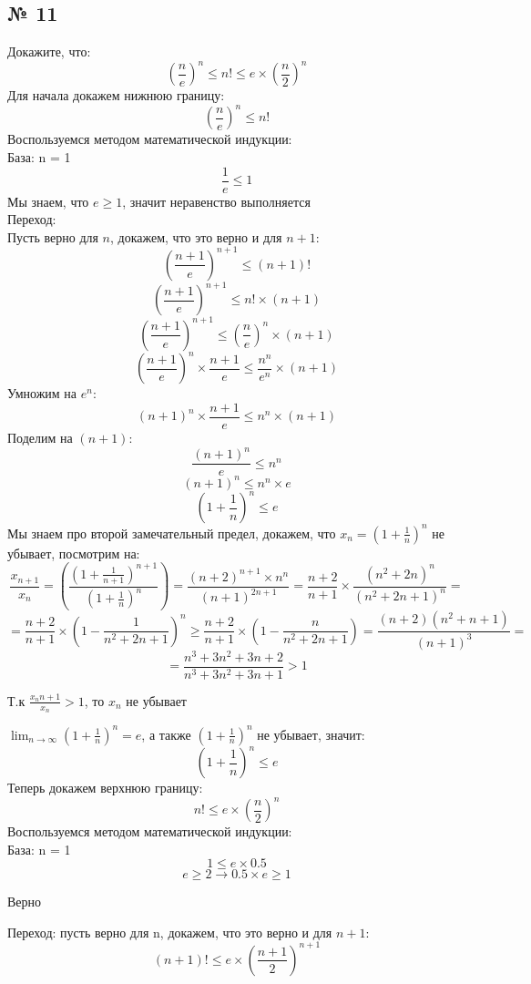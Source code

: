 \documentclass[a4paper,12pt]{article}
\begin{document}
\begin{itemize}
\section*{№ 11}
Докажите,  что:
\[
\left(\frac{n}{e}\right)^n \leq n! \leq e\times \left(\frac{n}{2}\right)^n
\]
Для начала докажем нижнюю границу:
\[
\left(\frac{n}{e}\right)^n \leq n!
\]
Воспользуемся методом математической индукции:
\\
База: n = 1
\\
\[
\frac{1}{e} \leq 1
\]
Мы знаем, что $e \geq 1$, значит неравенство выполняется
\\
Переход:
\\
Пусть верно для $ n $, докажем,  что это верно и для $n+1$:
\[
\left(\frac{n+1}{e}\right)^{n+1} \leq (n+1)!
\]
\[
\left(\frac{n+1}{e}\right)^{n+1} \leq n! \times (n+1)
\]
\[
\left(\frac{n+1}{e}\right)^{n+1} \leq \left(\frac{n}{e}\right)^n \times (n+1)
\]
\[
\left(\frac{n+1}{e}\right)^{n} \times \frac{n+1}{e} \leq \frac{n^n}{e^n} \times (n+1)
\]
Умножим на $e^n$:
\[
(n+1)^n \times \frac{n+1}{e} \leq n^n \times (n+1)
\]
Поделим на $(n+1)$:
\[
\frac{(n+1)^n}{e} \leq n^n
\]
\[
(n+1) ^ n \leq n^n \times e
\]
\[
\left(1 + \frac{1}{n}\right)^n \leq e
\]
Мы знаем про второй замечательный предел, докажем, что $x_n =  \left(1 + \frac{1}{n}\right)^n $ не убывает, посмотрим на:
\[
\frac{x_{n+1}}{x_n} = \left(\frac{(1+\frac{1}{n+1})^{n+1}}{(1+\frac{1}{n})^n}\right) = \frac{(n+2)^{n+1}\times n^n}{(n+1)^{2n+1}} = \frac{n+2}{n+1} \times \frac{(n^2+2n)^n}{(n^2+2n+1)^n} = 
\]
\[
= \frac{n+2}{n+1} \times \left(1 - \frac{1}{n^2+2n+1}\right)^n \geq \frac{n+2}{n+1} \times \left(1 - \frac{n}{n^2+2n+1}\right) = \frac{(n+2)(n^2+n+1)}{(n+1)^3} = 
\]
\[
= \frac{n^3 + 3n^2 +3n + 2}{n^3 + 3n^2 +3n + 1} > 1 
\]
\begin{center}
Т.к $\frac{x_n{n+1}}{x_n} > 1$, то $x_n$ не убывает
\end{center}
$ \lim_{n \rightarrow \infty} \left(1 + \frac{1}{n}\right)^n = e $, а также $ \left(1 + \frac{1}{n}\right)^n $ не убывает, значит:
\[
\left(1 + \frac{1}{n}\right)^n \leq e
\]
Теперь докажем верхнюю границу:
\[
n! \leq e \times \left(\frac{n}{2}\right) ^ n
\]
Воспользуемся методом математической индукции:
\\
База: n = 1
\\
\[
1 \leq e \times 0.5
\]
\[
e \geq 2 \rightarrow 0.5 \times e \geq 1
\]
\begin{center}
Верно
\end{center}
Переход: пусть верно для n, докажем,  что это верно и для  $n+1$:
\[
(n+1)! \leq e \times \left(\frac{n+1}{2}\right)^{n+1}
\]
\end{itemize}
\end{document}
